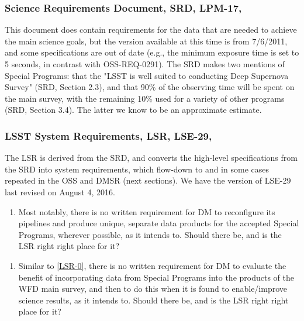 \documentclass[DM,lsstdraft,toc]{lsstdoc}
\begin{document}
\subsubsection{Science Requirements Document, SRD, LPM-17, \cite{LPM-17}}\label{sssec:dmplans_review_srd}

This document does contain requirements for the data that are needed to achieve the main science goals, but the version available at this time is from 7/6/2011, and some specifications are out of date (e.g., the minimum exposure time is set to 5 seconds, in contrast with OSS-REQ-0291). The SRD makes two mentions of Special Programs: that the "LSST is well suited to conducting Deep Supernova Survey" (SRD, Section 2.3), and that 90\% of the observing time will be spent on the main survey, with the remaining 10\% used for a variety of other programs (SRD, Section 3.4). The latter we know to be an approximate estimate.


\subsubsection{LSST System Requirements, LSR, LSE-29, \cite{LSE-29}}\label{sssec:dmplans_review_lsr}

The LSR is derived from the SRD, and converts the high-level specifications from the SRD into system requirements, which flow-down to and in some cases repeated in the OSS and DMSR (next sections). We have the version of LSE-29 last revised on August 4, 2016.

\begin{enumerate}[topsep=-10pt,after=\vspace{10pt},label= \textbf{Concern \Roman*.},resume] \item \label{LSR-0} Most notably, there is no written requirement for DM to reconfigure its pipelines and produce unique, separate data products for the accepted Special Programs, wherever possible, as it intends to. Should there be, and is the LSR right right place for it? \end{enumerate}

\begin{enumerate}[topsep=-10pt,after=\vspace{10pt},label= \textbf{Concern \Roman*.},resume] \item \label{LSR-0b} Similar to \ref{LSR-0}, there is no written requirement for DM to evaluate the benefit of incorporating data from Special Programs into the products of the WFD main survey, and then to do this when it is found to enable/improve science results, as it intends to. Should there be, and is the LSR right right place for it? \end{enumerate}
\end{document}
